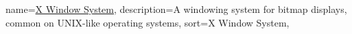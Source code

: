 \newcommand{\dvttermvirtutech}{Virtutech}

\newcommand{\dvttermwarp}{\dvttermmicrosoft\ \dvtcmdabbrev{dvtglosswarp}}
\newcommand{\dvttermwindriver}{Wind River Systems, Inc.}

{
  name=\href{http://en.wikipedia.org/wiki/X_Window_System}{X Window System},
  description={A windowing system for bitmap displays, common on UNIX-like operating systems},
  sort={X Window System}, %
}
\newcommand{\dvttermxeleven}{\glslink{dvtglossxeleven}{X11}}
\newcommand{\dvttermxeightysix}{x86}


